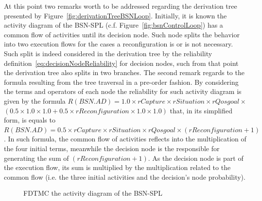 At this point two remarks worth to be addressed regarding the derivation tree
presented by Figure~\ref{fig:derivationTreeBSNLoop}. Initially, it is known the
activity diagram of the BSN-SPL (c.f. Figure~\ref{fig:bsnControlLoop}) has a
common flow of activities until its decision node. Such node splits the
behavior into two execution flows for the cases a reconfiguration is or is not
necessary. Such split is indeed considered in the derivation tree by the
reliability definition~\ref{eq:decisionNodeReliability} for decision nodes,
such from that point the derivation tree also splits in two branches. The
second remark regards to the formula resulting from the tree traversal in a
pre-order fashion. By considering the terms and operators of each node the
reliability for such activity diagram is given by the formula $R(BSN.AD)= 1.0
\times rCapture \times rSituation \times rQosgoal \times $\\$(0.5 \times 1.0
\times 1.0 + 0.5 \times rReconfiguration \times 1.0 \times 1.0) $ that, in its
simplified form, is equals to $R(BSN.AD)= 0.5\times  rCapture \times rSituation \times
rQosgoal \times ( rReconfiguration + 1)$. In such formula, the common flow of
activities reflects into the multiplication of the four initial terms,
meanwhile the decision node is the responsible for generating the sum of
$(rReconfiguration + 1)$. As the decision node is part of the execution flow,
its sum is multiplied by the multiplication related to the common flow (i.e.
the three initial activities and the decision's node probability). 

\begin{figure}[htp]
	\centering
	\resizebox{\columnwidth}{!}{}
	\caption{FDTMC the activity diagram of the BSN-SPL}
	\label{fig:fdtmcBSNLoop}
\end{figure}

